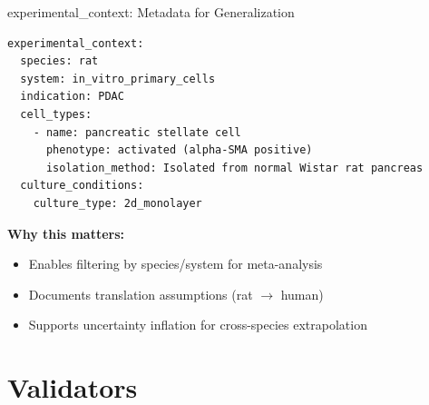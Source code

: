 \documentclass[aspectratio=169,10pt]{beamer}
\begin{document}
\begin{frame}[fragile]{experimental\_context: Metadata for Generalization}
\begin{lstlisting}[style=yaml]
experimental_context:
  species: rat
  system: in_vitro_primary_cells
  indication: PDAC
  cell_types:
    - name: pancreatic stellate cell
      phenotype: activated (alpha-SMA positive)
      isolation_method: Isolated from normal Wistar rat pancreas
  culture_conditions:
    culture_type: 2d_monolayer
\end{lstlisting}

\vspace{0.5em}
\textbf{Why this matters:}
\begin{itemize}
    \item Enables filtering by species/system for meta-analysis
    \item Documents translation assumptions (rat $\rightarrow$ human)
    \item Supports uncertainty inflation for cross-species extrapolation
\end{itemize}
\end{frame}

\section{Validators}
\end{document}
